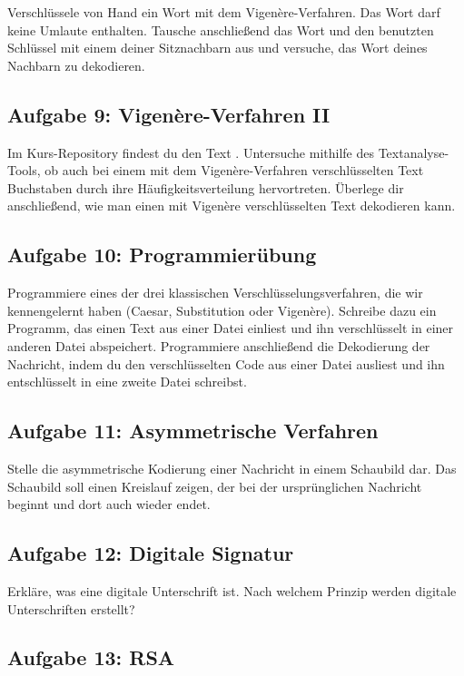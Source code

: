 Verschlüssele von Hand ein Wort mit dem Vigenère-Verfahren. Das Wort darf keine
Umlaute enthalten. Tausche anschließend das Wort und den benutzten Schlüssel mit
einem deiner Sitznachbarn aus und versuche, das Wort deines Nachbarn zu
dekodieren.


\subsection{Aufgabe 9: Vigenère-Verfahren II}

Im Kurs-Repository findest du den Text . Untersuche
mithilfe des Textanalyse-Tools, ob auch bei einem mit dem Vigenère-Verfahren
verschlüsselten Text Buchstaben durch ihre Häufigkeitsverteilung hervortreten.
Überlege dir anschließend, wie man einen mit Vigenère verschlüsselten Text
dekodieren kann.


\subsection{Aufgabe 10: Programmierübung}

Programmiere eines der drei klassischen Verschlüsselungsverfahren, die wir
kennengelernt haben (Caesar, Substitution oder Vigenère). Schreibe dazu ein
Programm, das einen Text aus einer Datei einliest und ihn verschlüsselt in
einer anderen Datei abspeichert. Programmiere anschließend die Dekodierung der
Nachricht, indem du den verschlüsselten Code aus einer Datei ausliest und ihn
entschlüsselt in eine zweite Datei schreibst.


\subsection{Aufgabe 11: Asymmetrische Verfahren}

Stelle die asymmetrische Kodierung einer Nachricht in einem Schaubild dar. Das
Schaubild soll einen Kreislauf zeigen, der bei der ursprünglichen Nachricht
beginnt und dort auch wieder endet.


\subsection{Aufgabe 12: Digitale Signatur}

Erkläre, was eine digitale Unterschrift ist. Nach welchem Prinzip werden
digitale Unterschriften erstellt?


\subsection{Aufgabe 13: RSA}

